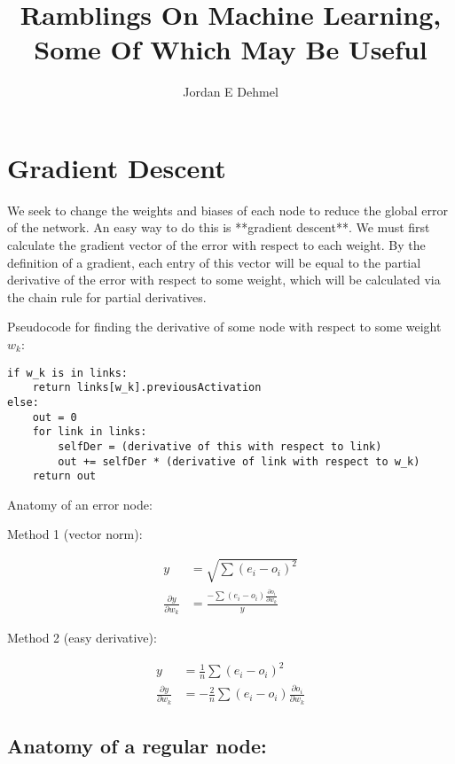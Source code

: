 \documentclass[8pt]{amsart}
\title{Ramblings On Machine Learning, Some Of Which May Be Useful}
\author{Jordan E Dehmel}
\begin{document}
\maketitle

\tableofcontents{}

\section{Gradient Descent}

We seek to change the weights and biases of each node to reduce the
global error of the network. An easy way to do this is **gradient descent**.
We must first calculate the gradient vector of the error with respect to
each weight. By the definition of a gradient, each entry of this vector will
be equal to the partial derivative of the error with respect to some weight,
which will be calculated via the chain rule for partial derivatives.

Pseudocode for finding the derivative of some node with respect to
some weight $w_k$:

\begin{verbatim}
if w_k is in links:
    return links[w_k].previousActivation
else:
    out = 0
    for link in links:
        selfDer = (derivative of this with respect to link)
        out += selfDer * (derivative of link with respect to w_k)
    return out
\end{verbatim}

Anatomy of an error node:

Method 1 (vector norm):

$$
\begin{aligned}
    y &= \sqrt{\sum{(e_i - o_i)^2}} \\
    \frac{\partial y}{\partial w_k} &= \frac{-\sum{(e_i - o_i)\frac{\partial o_i}{\partial w_k}}}{y}
\end{aligned}
$$

Method 2 (easy derivative):

$$
\begin{aligned}
    y &= \frac{1}{n} \sum{(e_i - o_i)^2} \\
    \frac{\partial y}{\partial w_k} &= - \frac{2}{n} \sum{(e_i - o_i) \frac{\partial o_i}{\partial w_k}}
\end{aligned}
$$

\subsection{Anatomy of a regular node:}
\end{document}
